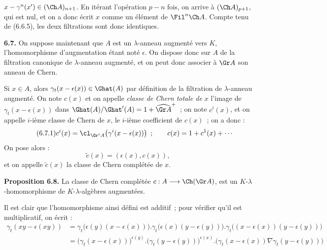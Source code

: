 \(x-\gamma^n(x')\in(\Ch A)_{n+1}\). En
itérant l'opération \(p-n\) fois, on arrive à \((\Ch A)_{p+1}\), qui est nul, et on a donc écrit \(x\) comme un élément de \(\Fil^n\Ch A\). Compte tenu de (6.6.5), les deux filtrations sont donc identiques.

\textbf{6.7.} On suppose maintenant que \(A\) est un \(\lambda\)-anneau augmenté vers \(K\), l'homomorphisme d'augmentation étant noté \(\epsilon\). On dispose donc sur \(A\) de la filtration canonique de \(\lambda\)-anneau augmenté, et on peut donc associer à \(\Gr A\) son anneau de Chern.

Si \(x\in A\), alors \(\gamma_t(x-\epsilon(x))\in\Ghat(A)\) par définition de la filtration de \(\lambda\)-anneau augmenté. On note \(c(x)\) et on appelle \emph{classe de Chern totale de} \(x\) l'image de \(\gamma_t(x-\epsilon(x))\) dans \(\Ghat(A)/\Ghat'(A)=1+\widehat{\Gr A}^{+}\)~; on note \(c^i(x)\), et on appelle \(i\)-ième classe de Chern de \(x\), le \(i\)-ième coefficient de \(c(x)\)~; on a donc :
\begin{equation}\tag{6.7.1}
  c^i(x)=\cl_{\Gr^iA}\!\left(\gamma^i(x-\epsilon(x))\right)~;\qquad
  c(x)=1+c^1(x)+\cdots
\end{equation}
On pose alors :
\begin{equation}\tag{6.7.2}
  \widetilde c(x)=(\epsilon(x),c(x)),
\end{equation}
et on appelle \(\widetilde c(x)\) la classe de Chern complétée de \(x\).

\textbf{Proposition 6.8.} La classe de Chern complétée \(c:A\longrightarrow\Ch(\Gr A)\), est un \(K\)-\(\lambda\)-homomorphisme de \(K\)-\(\lambda\)-algèbres augmentées.

Il est clair que l'homomorphisme ainsi défini est additif~; pour vérifier qu'il est multiplicatif, on écrit :
\[
\begin{aligned}
\gamma_t(xy-\epsilon(xy))
&=\gamma_t\bigl(\epsilon(y)(x-\epsilon(x))\bigr).
  \gamma_t\bigl(\epsilon(x)(y-\epsilon(y))\bigr).
  \gamma_t\bigl((x-\epsilon(x))(y-\epsilon(y))\bigr)\\
&=\bigl(\gamma_t(x-\epsilon(x))\bigr)^{\epsilon(y)}.
  \bigl(\gamma_t(y-\epsilon(y))\bigr)^{\epsilon(x)}.
  \bigl(\gamma_t(x-\epsilon(x))\nabla\gamma_t(y-\epsilon(y))\bigr)
\end{aligned}
\]
